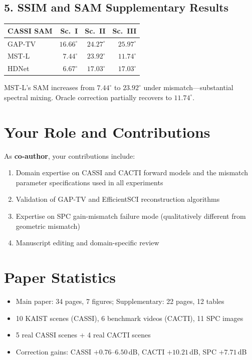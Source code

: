\documentclass[11pt]{article}
\begin{document}
\subsection*{5. SSIM and SAM Supplementary Results}

\begin{center}
\begin{tabular}{lrrr}
\toprule
\textbf{CASSI SAM} & \textbf{Sc.~I} & \textbf{Sc.~II} & \textbf{Sc.~III} \\
\midrule
GAP-TV  & $16.66^\circ$ & $24.27^\circ$ & $25.97^\circ$ \\
MST-L   & $7.44^\circ$  & $23.92^\circ$ & $11.74^\circ$ \\
HDNet   & $6.67^\circ$  & $17.03^\circ$ & $17.03^\circ$ \\
\bottomrule
\end{tabular}
\end{center}

\noindent MST-L's SAM increases from $7.44^\circ$ to $23.92^\circ$ under mismatch---substantial spectral mixing.  Oracle correction partially recovers to $11.74^\circ$.

\section*{Your Role and Contributions}

As \textbf{co-author}, your contributions include:
\begin{enumerate}
  \item Domain expertise on CASSI and CACTI forward models and the mismatch parameter specifications used in all experiments
  \item Validation of GAP-TV and EfficientSCI reconstruction algorithms
  \item Expertise on SPC gain-mismatch failure mode (qualitatively different from geometric mismatch)
  \item Manuscript editing and domain-specific review
\end{enumerate}

\section*{Paper Statistics}
\begin{itemize}
  \item Main paper: 34 pages, 7 figures; Supplementary: 22 pages, 12 tables
  \item 10 KAIST scenes (CASSI), 6 benchmark videos (CACTI), 11 SPC images
  \item 5 real CASSI scenes + 4 real CACTI scenes
  \item Correction gains: CASSI $+0.76$--$6.50$\,dB, CACTI $+10.21$\,dB, SPC $+7.71$\,dB
\end{itemize}
\end{document}
